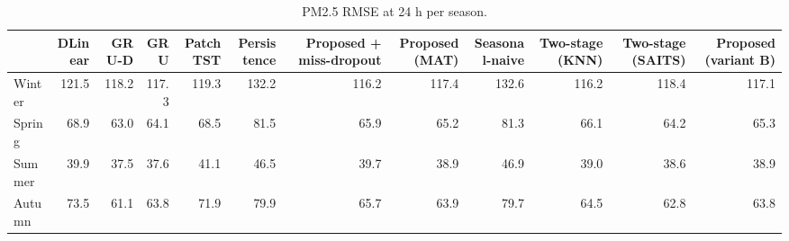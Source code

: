 \begin{table}
\caption{PM2.5 RMSE at 24 h per season.}
\label{tab:seasonal}
\begin{tabular}{lrrrrrrrrrrr}
\toprule
 & DLinear & GRU-D & GRU & PatchTST & Persistence & Proposed + miss-dropout & Proposed (MAT) & Seasonal-naive & Two-stage (KNN) & Two-stage (SAITS) & Proposed (variant B) \\
\midrule
Winter & 121.5 & 118.2 & 117.3 & 119.3 & 132.2 & 116.2 & 117.4 & 132.6 & 116.2 & 118.4 & 117.1 \\
Spring & 68.9 & 63.0 & 64.1 & 68.5 & 81.5 & 65.9 & 65.2 & 81.3 & 66.1 & 64.2 & 65.3 \\
Summer & 39.9 & 37.5 & 37.6 & 41.1 & 46.5 & 39.7 & 38.9 & 46.9 & 39.0 & 38.6 & 38.9 \\
Autumn & 73.5 & 61.1 & 63.8 & 71.9 & 79.9 & 65.7 & 63.9 & 79.7 & 64.5 & 62.8 & 63.8 \\
\bottomrule
\end{tabular}
\end{table}
